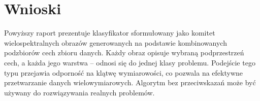 \documentclass[]{article}
\begin{document}
\FloatBarrier

\section{Wnioski}

Powyższy raport prezentuje klasyfikator sformułowany jako komitet wielospektralnych obrazów generowanych na podstawie kombinowanych podzbiorów cech zbioru danych. Każdy obraz opisuje wybraną podprzestrzeń cech, a każda jego warstwa -- odnosi się do jednej klasy problemu. Podejście tego typu przejawia odporność na klątwę wymiarowości, co pozwala na efektywne przetwarzanie danych wielowymiarowych. Algorytm bez przeciwskazań może być używany do rozwiązywania realnych problemów.



\end{document}
